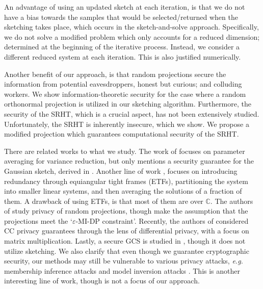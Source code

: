 \documentclass[journal,letterpaper,onecolumn,twoside,nofonttune]{IEEEtran}
\newcommand{\C}{\mathbb{C}}
\begin{document}
An advantage of using an updated sketch at each iteration, is that we do not have a bias towards the samples that would be selected/returned when the sketching takes place, which occurs in the sketch-and-solve approach. Specifically, we do not solve a modified problem which only accounts for a reduced dimension; determined at the beginning of the iterative process. Instead, we consider a different reduced system at each iteration. This is also justified numerically.

Another benefit of our approach, is that random projections secure the information from potential eavesdroppers, honest but curious; and colluding workers. We show information-theoretic security for the case where a random orthonormal projection is utilized in our sketching algorithm. Furthermore, the security of the SRHT, which is a crucial aspect, has not been extensively studied. Unfortunately, the SRHT is inherently insecure, which we show. We propose a modified projection which guarantees computational security of the SRHT.

There are related works to what we study. The work of \cite{BP23} focuses on parameter averaging for variance reduction, but only mentions a security guarantee for the Gaussian sketch, derived in \cite{ZWL08}. Another line of work \cite{KSD17,KSDY19}, focuses on introducing redundancy through equiangular tight frames (ETFs), partitioning the system into smaller linear systems, and then averaging the solutions of a fraction of them. A drawback of using ETFs, is that most of them are over $\C$. The authors of \cite{SKD18} study privacy of random projections, though make the assumption that the projections meet the `$\varepsilon$-MI-DP constraint'. Recently, the authors of \cite{LSM23} considered CC privacy guarantees through the lens
of differential privacy, with a focus on matrix multiplication. Lastly, a secure GCS is studied in \cite{YA19}, though it does not utilize sketching. We also clarify that even though we guarantee cryptographic security, our methods may still be vulnerable to various privacy attacks, \textit{e.g.} membership inference attacks \cite{FJR15} and model inversion attacks \cite{SSSS17}. This is another interesting line of work, though is not a focus of our approach.
\end{document}

